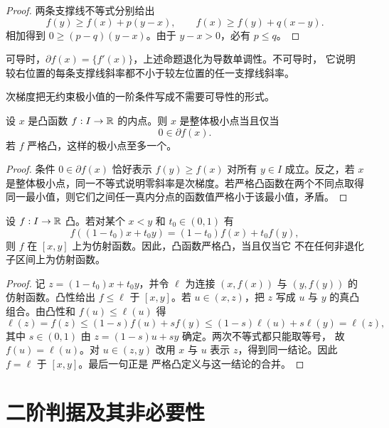 \begin{proof}
两条支撑线不等式分别给出
\[
 f(y)\ge f(x)+p(y-x),\qquad
 f(x)\ge f(y)+q(x-y).
\]
相加得到 \(0\ge(p-q)(y-x)\)。由于 \(y-x>0\)，必有 \(p\le q\)。
\end{proof}

可导时，\(\partial f(x)=\{f'(x)\}\)，上述命题退化为导数单调性。不可导时，
它说明较右位置的每条支撑线斜率都不小于较左位置的任一支撑线斜率。

次梯度把无约束极小值的一阶条件写成不需要可导性的形式。

\begin{proposition}[凸函数的极小值判据]
\label{prop:convex-minimum-subgradient}
设 \(x\) 是凸函数 \(f:I\to\mathbb{R}\) 的内点。则 \(x\) 是整体极小点当且仅当
\[
 0\in\partial f(x).
\]
若 \(f\) 严格凸，这样的极小点至多一个。
\end{proposition}

\begin{proof}
条件 \(0\in\partial f(x)\) 恰好表示 \(f(y)\ge f(x)\) 对所有 \(y\in I\) 成立。反之，若 \(x\) 是整体极小点，同一不等式说明零斜率是次梯度。若严格凸函数在两个不同点取得同一最小值，则它们之间任一真内分点的函数值严格小于该最小值，矛盾。
\end{proof}

\begin{proposition}[严格凸性的等号判据]
\label{prop:strict-convexity-equality}
设 \(f:I\to\mathbb{R}\) 凸。若对某个 \(x<y\) 和 \(t_0\in(0,1)\) 有
\[
 f((1-t_0)x+t_0y)=(1-t_0)f(x)+t_0f(y),
\]
则 \(f\) 在 \([x,y]\) 上为仿射函数。因此，凸函数严格凸，当且仅当它
不在任何非退化子区间上为仿射函数。
\end{proposition}

\begin{proof}
记 \(z=(1-t_0)x+t_0y\)，并令 \(\ell\) 为连接 \((x,f(x))\) 与
\((y,f(y))\) 的仿射函数。凸性给出 \(f\le\ell\) 于 \([x,y]\)。若
\(u\in(x,z)\)，把 \(z\) 写成 \(u\) 与 \(y\) 的真凸组合。由凸性和
\(f(u)\le\ell(u)\) 得
\[
 \ell(z)=f(z)
 \le (1-s)f(u)+sf(y)
 \le (1-s)\ell(u)+s\ell(y)=\ell(z),
\]
其中 \(s\in(0,1)\) 由 \(z=(1-s)u+sy\) 确定。两次不等式都只能取等号，
故 \(f(u)=\ell(u)\)。对 \(u\in(z,y)\) 改用 \(x\) 与 \(u\) 表示
\(z\)，得到同一结论。因此 \(f=\ell\) 于 \([x,y]\)。最后一句正是
严格凸定义与这一结论的合并。
\end{proof}

\section{二阶判据及其非必要性}


